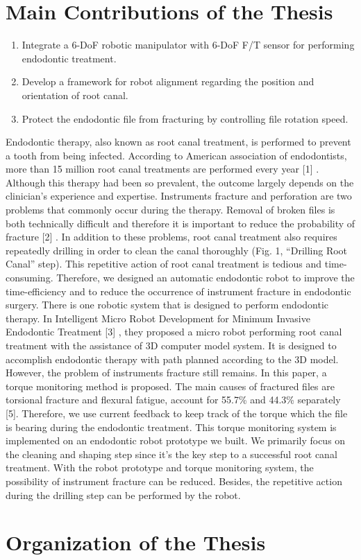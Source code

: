\section{Main Contributions of the Thesis}
\begin{enumerate}
	\item	Integrate a 6-DoF robotic manipulator with 6-DoF F/T sensor for performing endodontic treatment.
	\item	Develop a framework for robot alignment regarding the position and orientation of root canal. 
	\item	Protect the endodontic file from fracturing by controlling file rotation speed.
\end{enumerate}
Endodontic therapy, also known as root canal treatment, is performed to prevent a tooth from being infected. According to American association of endodontists, more than 15 million root canal treatments are performed every year [1] . Although this therapy had been so prevalent, the outcome largely depends on the clinician’s experience and expertise. Instruments fracture and perforation are two problems that commonly occur during the therapy. Removal of broken files is both technically difficult and therefore it is important to reduce the probability of fracture [2] . In addition to these problems, root canal treatment also requires repeatedly drilling in order to clean the canal thoroughly (Fig. 1, “Drilling Root Canal” step).  This repetitive action of root canal treatment is tedious and time-consuming. Therefore, we designed an automatic endodontic robot to improve the time-efficiency and to reduce the occurrence of instrument fracture in endodontic surgery.
There is one robotic system that is designed to perform endodontic therapy. In Intelligent Micro Robot Development for Minimum Invasive Endodontic Treatment [3] , they proposed a micro robot performing root canal treatment with the assistance of 3D computer model system. It is designed to accomplish endodontic therapy with path planned according to the 3D model. However, the problem of instruments fracture still remains. 
In this paper, a torque monitoring method is proposed. The main causes of fractured files are torsional fracture and flexural fatigue, account for 55.7\% and 44.3\% separately [5]. Therefore, we use current feedback to keep track of the torque which the file is bearing during the endodontic treatment. This torque monitoring system is implemented on an endodontic robot prototype we built. We primarily focus on the cleaning and shaping step since it’s the key step to a successful root canal treatment. With the robot prototype and torque monitoring system, the possibility of instrument fracture can be reduced. Besides, the repetitive action during the drilling step can be performed by the robot.

\section{Organization of the Thesis}